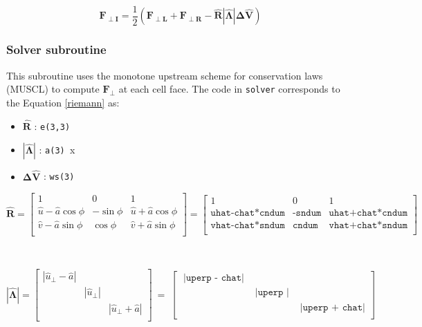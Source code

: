 \documentclass{article}
\newcommand{\code}[1]{\texttt{#1}}
\begin{document}
\begin{equation*}
\mathbf{F_{\perp I}} =
	 \frac{1}{2} (\mathbf{F_{\perp L}} + \mathbf{F_{\perp R}} - \mathbf{\hat{R} |\hat{\Lambda}| \Delta \hat V  })
\end{equation*}


\subsubsection*{Solver subroutine}

This subroutine uses the monotone upstream scheme for conservation laws (MUSCL) to compute $\mathbf{F_\perp}$ at each cell face.  The code in \code{solver} corresponds to the Equation \ref{riemann} as: 

 \begin{itemize}
 	\item $\mathbf{\hat{R}}$ : \code{e(3,3)}
 	\item $\mathbf{|\hat{\Lambda}|}$ : \code{a(3) }x
 	\item $\mathbf{ \Delta \hat V  }  $ : \code{ws(3)} 
 \end{itemize}
 
 \[ \mathbf{\hat{R}} = 
\begin{bmatrix}
    1 &  0  & 1  \\
    \hat{u} -\hat{a} \cos{\phi} &   -\sin{\phi} & \hat{u} +\hat{a} \cos{\phi}   \\
    \hat{v} -\hat{a} \sin{\phi} &   \cos{\phi} & \hat{v} +\hat{a} \sin{\phi}    \\
\end{bmatrix} = 
\begin{bmatrix}
    1 &  0  & 1  \\
    \code{uhat-chat*cndum} &    \code{-sndum} &  \code{uhat+chat*cndum} \\
    \code{vhat-chat*sndum} &    \code{cndum} &  \code{vhat+chat*sndum} \\
\end{bmatrix}
\]

\
 
 \[ \mathbf{|\hat{\Lambda}|} = 
\begin{bmatrix}
  |\hat{u}_\perp - \hat a| &  &  \\
     &   |\hat{u}_\perp | &  \\ 
     & &  |\hat{u}_\perp  + \hat a| \\
\end{bmatrix} \ =  \
\begin{bmatrix}
 \code{ |uperp - chat|} &  &  \\
     &    \code{ |uperp |} &  \\ 
     & &   \code{ |uperp + chat|} \\
\end{bmatrix} 
\]
\end{document}

